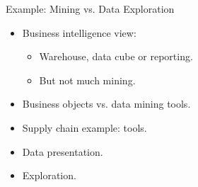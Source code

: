 \begin{frame}{Example: Mining vs. Data Exploration}
	\begin{itemize}
		\item Business intelligence view:
		\begin{itemize}
			\item Warehouse, data cube or reporting.
			\item But not much mining.
		\end{itemize}
		\item Business objects vs. data mining tools.
		\item Supply chain example: tools.
		\item Data presentation.
		\item Exploration.
	\end{itemize}
\end{frame}

